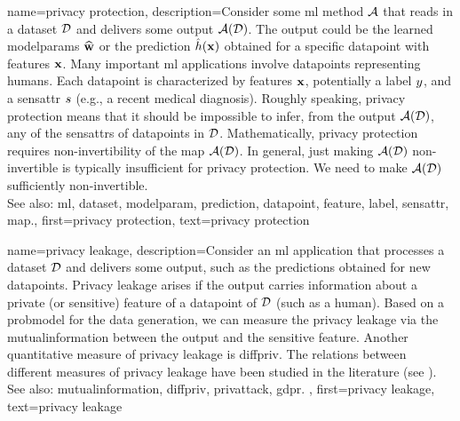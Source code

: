 {name={privacy protection},
     description={Consider some \gls{ml} method $\mathcal{A}$ that reads 
	 	in a \gls{dataset} $\mathcal{D}$ and delivers some \gls{output} $\mathcal{A}(\mathcal{D})$. The \gls{output} 
	 	could be the learned \glspl{modelparam} $\widehat{{\bf w}}$ or the \gls{prediction} 
	 	$\hat{h}({\bf x})$ obtained for a specific \gls{datapoint} with \glspl{feature} 
	 	${\bf x}$. Many important \gls{ml} applications involve \glspl{datapoint} 
		representing humans. Each \gls{datapoint} is characterized by \glspl{feature} ${\bf x}$, 
		potentially a \gls{label} $y$, and a \gls{sensattr} $s$ (e.g., a recent medical diagnosis). 
		Roughly speaking, privacy protection means that it should be impossible to infer, from the \gls{output} $\mathcal{A}(\mathcal{D})$, 
		any of the \glspl{sensattr} of \glspl{datapoint} in $\mathcal{D}$. Mathematically, privacy protection requires non-invertibility 
		of the \gls{map} $\mathcal{A}(\mathcal{D})$. In general, just making $\mathcal{A}(\mathcal{D})$ non-invertible 
		is typically insufficient for privacy protection. We need to make $\mathcal{A}(\mathcal{D})$ sufficiently non-invertible. 
					\\ 
		See also: \gls{ml}, \gls{dataset}, \gls{modelparam}, \gls{prediction}, \gls{datapoint}, \gls{feature}, \gls{label}, \gls{sensattr}, \gls{map}.}, 
	first={privacy protection}, 
	text={privacy protection} 
}

{name={privacy leakage},
	description={Consider an \gls{ml} application that processes a 
		\gls{dataset} $\mathcal{D}$ and delivers some \gls{output}, such as the \glspl{prediction} 
		obtained for new \glspl{datapoint}. Privacy leakage arises 
		if the \gls{output} carries information about a private (or sensitive) \gls{feature} of 
		a \gls{datapoint} of $\mathcal{D}$ (such as a human). Based on a \gls{probmodel} 
		for the \gls{data} generation, we can measure the privacy leakage via the \gls{mutualinformation} 
		between the \gls{output} and the sensitive \gls{feature}. Another quantitative \gls{measure} of privacy leakage 
		is \gls{diffpriv}. The relations between different \glspl{measure} of privacy leakage have been 
		studied in the literature (see \cite{InfThDiffPriv}). 
				\\ 
		See also: \gls{mutualinformation}, \gls{diffpriv}, \gls{privattack}, \gls{gdpr}. }, 
	first={privacy leakage}, 
	text={privacy leakage} 
}

